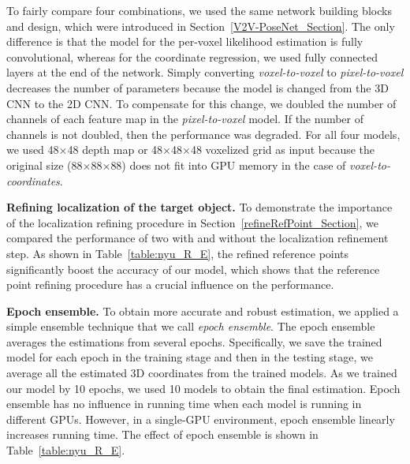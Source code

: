 To fairly compare four combinations, we used the same network building blocks and design, which were introduced in Section~\ref{V2V-PoseNet_Section}. The only difference is that the model for the per-voxel likelihood estimation is fully convolutional, whereas for the coordinate regression, we used fully connected layers at the end of the network. Simply converting \emph{voxel-to-voxel} to \emph{pixel-to-voxel} decreases the number of parameters because the model is changed from the 3D CNN to the 2D CNN. To compensate for this change, we doubled the number of channels of each feature map in the \emph{pixel-to-voxel} model. If the number of channels is not doubled, then the performance was degraded. For all four models, we used 48$\times$48 depth map or 48$\times$48$\times$48 voxelized grid as input because the original size (88$\times$88$\times$88) does not fit into GPU memory in the case of \emph{voxel-to-coordinates}.


{\bf Refining localization of the target object.}
To demonstrate the importance of the localization refining procedure in Section~\ref{refineRefPoint_Section}, we compared the performance of two with and without the localization refinement step. As shown in Table~\ref{table:nyu_R_E}, the refined reference points significantly boost the accuracy of our model, which shows that the reference point refining procedure has a crucial influence on the performance.


{\bf Epoch ensemble.}
To obtain more accurate and robust estimation, we applied a simple ensemble technique that we call \emph{epoch ensemble}. The epoch ensemble averages the estimations from several epochs. Specifically, we save the trained model for each epoch in the training stage and then in the testing stage, we average all the estimated 3D coordinates from the trained models. As we trained our model by 10 epochs, we used 10 models to obtain the final estimation. Epoch ensemble has no influence in running time when each model is running in different GPUs. However, in a single-GPU environment, epoch ensemble linearly increases running time. The effect of epoch ensemble is shown in Table~\ref{table:nyu_R_E}.


